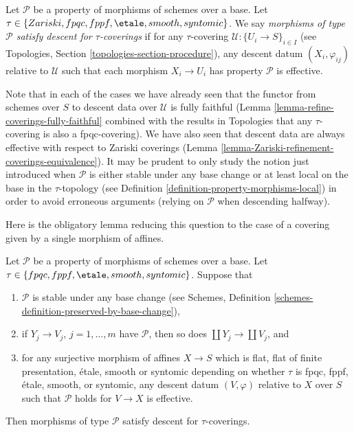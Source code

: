 \begin{definition}
\label{definition-descending-types-morphisms}
Let $\mathcal{P}$ be a property of morphisms of schemes over a base.
Let $\tau \in \{Zariski, fpqc, fppf, \etale, smooth, syntomic\}$.
We say
{\it morphisms of type $\mathcal{P}$ satisfy descent for $\tau$-coverings}
if for
any $\tau$-covering $\mathcal{U} : \{U_i \to S\}_{i \in I}$
(see Topologies, Section \ref{topologies-section-procedure}),
any descent datum $(X_i, \varphi_{ij})$ relative to $\mathcal{U}$
such that each morphism $X_i \to U_i$ has property $\mathcal{P}$
is effective.
\end{definition}

\noindent
Note that in each of the cases we have already seen that
the functor from schemes over $S$ to descent data over
$\mathcal{U}$ is fully faithful
(Lemma \ref{lemma-refine-coverings-fully-faithful} combined
with the results in Topologies that any $\tau$-covering
is also a fpqc-covering).
We have also seen that descent data are always effective with
respect to Zariski coverings
(Lemma \ref{lemma-Zariski-refinement-coverings-equivalence}).
It may be prudent to only study the notion just introduced
when $\mathcal{P}$ is either stable under any base change or at least
local on the base in the $\tau$-topology
(see Definition \ref{definition-property-morphisms-local})
in order to avoid erroneous arguments (relying on $\mathcal{P}$
when descending halfway).

\medskip\noindent
Here is the obligatory lemma reducing this question
to the case of a covering given by a single morphism of affines.

\begin{lemma}
\label{lemma-descending-types-morphisms}
Let $\mathcal{P}$ be a property of morphisms of schemes over a base.
Let $\tau \in \{fpqc, fppf, \etale, smooth, syntomic\}$.
Suppose that
\begin{enumerate}
\item $\mathcal{P}$ is stable under any base change
(see Schemes, Definition \ref{schemes-definition-preserved-by-base-change}),
\item if $Y_j \to V_j$, $j = 1, \ldots, m$ have $\mathcal{P}$,
then so does $\coprod Y_j \to \coprod V_j$, and
\item for any surjective morphism of affines
$X \to S$ which is flat, flat of finite presentation,
\'etale, smooth or syntomic depending on whether $\tau$ is
fpqc, fppf, \'etale, smooth, or syntomic,
any descent datum $(V, \varphi)$ relative
to $X$ over $S$ such that $\mathcal{P}$ holds for
$V \to X$ is effective.
\end{enumerate}
Then morphisms of type $\mathcal{P}$ satisfy descent for $\tau$-coverings.
\end{lemma}

